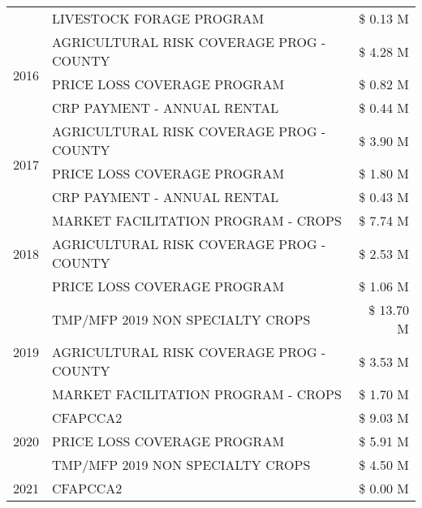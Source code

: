 \begin{tabular}{llr}
 & LIVESTOCK FORAGE PROGRAM & \$ 0.13 M \\
\cline{1-3}
\multirow[t]{3}{*}{2016} & AGRICULTURAL RISK COVERAGE PROG - COUNTY & \$ 4.28 M \\
 & PRICE LOSS COVERAGE PROGRAM & \$ 0.82 M \\
 & CRP PAYMENT - ANNUAL RENTAL & \$ 0.44 M \\
\cline{1-3}
\multirow[t]{3}{*}{2017} & AGRICULTURAL RISK COVERAGE PROG - COUNTY & \$ 3.90 M \\
 & PRICE LOSS COVERAGE PROGRAM & \$ 1.80 M \\
 & CRP PAYMENT - ANNUAL RENTAL & \$ 0.43 M \\
\cline{1-3}
\multirow[t]{3}{*}{2018} & MARKET FACILITATION PROGRAM - CROPS & \$ 7.74 M \\
 & AGRICULTURAL RISK COVERAGE PROG - COUNTY & \$ 2.53 M \\
 & PRICE LOSS COVERAGE PROGRAM & \$ 1.06 M \\
\cline{1-3}
\multirow[t]{3}{*}{2019} & TMP/MFP 2019 NON SPECIALTY CROPS & \$ 13.70 M \\
 & AGRICULTURAL RISK COVERAGE PROG - COUNTY & \$ 3.53 M \\
 & MARKET FACILITATION PROGRAM - CROPS & \$ 1.70 M \\
\cline{1-3}
\multirow[t]{3}{*}{2020} & CFAPCCA2 & \$ 9.03 M \\
 & PRICE LOSS COVERAGE PROGRAM & \$ 5.91 M \\
 & TMP/MFP 2019 NON SPECIALTY CROPS & \$ 4.50 M \\
\cline{1-3}
2021 & CFAPCCA2 & \$ 0.00 M \\
\cline{1-3}
\bottomrule
\end{tabular}
